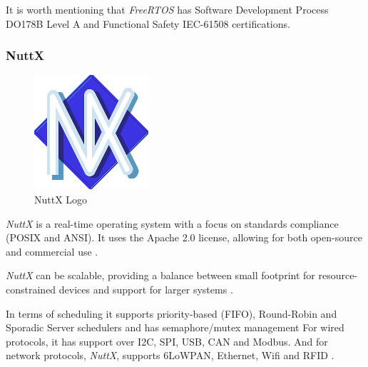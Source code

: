 It is worth mentioning that \textit{FreeRTOS} has Software Development Process DO178B Level A and Functional Safety IEC-61508 certifications.

\subsubsection{NuttX}
\begin{figure}
    \begin{center}
        \includegraphics[scale=0.25]{ch3/assets/nuttx.png}
    \end{center}
    \caption{NuttX Logo}
\end{figure}

\textit{NuttX} is a real-time operating system with a focus on standards compliance (POSIX and ANSI).
It uses the Apache 2.0 license, allowing for both open-source and commercial use \cite{nuttx}.

\textit{NuttX} can be scalable, providing a balance between small footprint for resource-constrained devices and support for larger systems \cite{nuttx}.

In terms of scheduling it supports priority-based (\gls{FIFO}), Round-Robin and Sporadic Server schedulers and has semaphore/mutex management
For wired protocols, it has support over \gls{I2C}, \gls{SPI}, \gls{USB}, \gls{CAN} and Modbus.
And for network protocols, \textit{NuttX}, supports 6LoWPAN, Ethernet, \gls{Wifi} and \gls{RFID} \cite{compRTOS}.

